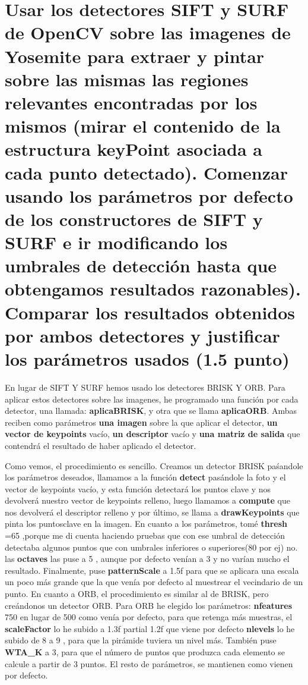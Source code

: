 \section{Usar los detectores SIFT y SURF de OpenCV sobre las imagenes de
Yosemite para extraer y pintar sobre las mismas las regiones relevantes
encontradas por los mismos (mirar el contenido de la estructura keyPoint
asociada a cada punto detectado). Comenzar usando los parámetros por
defecto de los constructores de SIFT y SURF e ir modificando los umbrales de
detección hasta que obtengamos resultados razonables). Comparar los
resultados obtenidos por ambos detectores y justificar los parámetros usados
(1.5 punto)}
En lugar de SIFT Y SURF hemos usado los detectores BRISK Y ORB. Para aplicar estos detectores sobre las
imagenes, he programado una función por cada detector, una llamada: \textbf{aplicaBRISK}, y otra que se llama
\textbf{aplicaORB}. Ambas reciben como parámetros \textbf{una imagen} sobre la que aplicar el detector,
\textbf{un vector de keypoints} vacío, \textbf{un descriptor} vacío y \textbf{una matriz de salida} que
contendrá el resultado de haber aplicado el detector.\newline

Como vemos, el procedimiento es sencillo. Creamos un detector BRISK paśandole los parámetros deseados,
llamamos a la función \textbf{detect} pasándole la foto y el vector de keypoints vacío, y esta función detectará los puntos clave
y nos devolverá nuestro vector de keypoints relleno, luego llamamos a \textbf{compute} que nos devolverá el descriptor relleno y
por último, se llama a \textbf{drawKeypoints} que pinta los puntosclave en la imagen. \newline
En cuanto a los parámetros, tomé \textbf{thresh} =65 ,porque me di cuenta haciendo pruebas que con ese umbral de detección
detectaba algunos puntos que con umbrales inferiores o superiores(80 por ej) no. las \textbf{octaves} las puse a 5 , aunque por defecto venían a 3 y no varían mucho el resultado.
Finalmente, puse \textbf{patternScale} a 1.5f para que se aplicara una escala un poco más grande que la que venía por defecto
al muestrear el vecindario de un punto. \newline
\newline
En cuanto a ORB, el procedimiento es similar al de BRISK, pero creándonos un detector ORB. Para ORB he elegido los parámetros:
\textbf{nfeatures}  750 en lugar de 500 como venía por defecto, para que retenga más muestras, el \textbf{scaleFactor} lo he subido a 1.3f partial 1.2f que viene por defecto
\textbf{nlevels} lo he subido de 8 a 9 , para que la pirámide tuviera un nivel más. También puse \textbf{WTA\_K} a 3, para
que el número de puntos que produzca cada elemento se calcule a partir de 3 puntos. El resto de parámetros, se mantienen como vienen por defecto.

